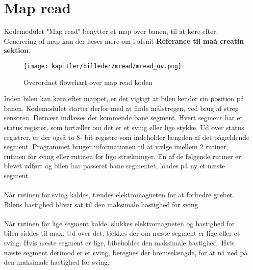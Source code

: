 \newpage

\section{Map read}

Kodemodulet "Map read"  benytter et map over banen, til at køre efter. Generering af map kan der læses mere om i afsnit \textbf{Referance til maå creatin sektion}.\\

\begin{figure}[ht]
\centering
\texttt{[image: kapitler/billeder/mread/mread\_ov.png]}
\caption{Overordnet flowchart over map read koden}
\label{fig:mread}
\end{figure}

Inden bilen kan køre efter mappet, er det vigtigt at bilen kender sin position på banen. Kodemodulet starter derfor med at finde målstregen, ved brug af streg sensoren. Dernæst indlæses det kommende bane segment. Hvert segment har et status register, som fortæller om det er et sving eller lige stykke. Ud over status registrer, er der også to 8- bit registre som indeholder længden af det pågældende segment. Programmet bruger informationen til at vælge imellem 2 rutiner, rutinen for sving eller rutinen for lige strækninger. En af de følgende rutiner er blevet udført og bilen har passeret bane segmentet, loades på ny et næste segment.\\
\\
Når rutinen for sving kaldes, tændes elektromagneten for at forbedre grebet. Bilens hastighed bliver sat til den maksimale hastighed for sving.\\
\\
Når rutinen for lige segment kalde, slukkes elektromagneten og hastighed for bilen siddes til max. Ud over det, tjekkes der om næste segment er lige eller et sving. Hvis næste segment er lige, bibeholdes den maksimale hastighed. Hvis næste segment derimod er et sving, beregnes der bremselængde, for at nå ned på den maksimale hastighed for sving.\\


